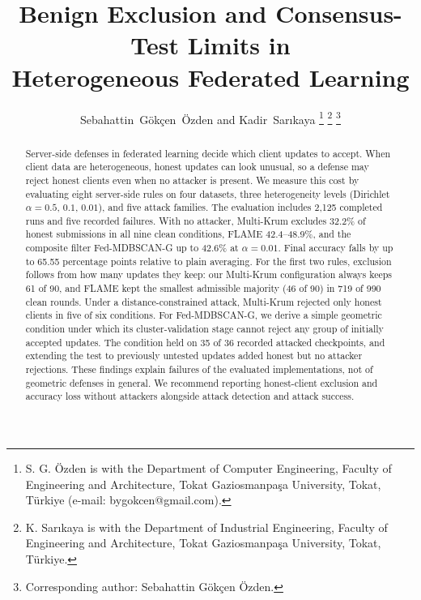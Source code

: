 \documentclass[journal]{IEEEtran}
\begin{document}
\title{Benign Exclusion and Consensus-Test Limits in\\Heterogeneous Federated Learning}

\author{Sebahattin~G\"ok\c{c}en~\"Ozden and Kadir~Sar{\i}kaya%
\thanks{S. G. \"Ozden is with the Department of Computer Engineering, Faculty of Engineering and Architecture, Tokat Gaziosmanpa\c{s}a University, Tokat, T\"urkiye (e-mail: bygokcen@gmail.com).}%
\thanks{K. Sar{\i}kaya is with the Department of Industrial Engineering, Faculty of Engineering and Architecture, Tokat Gaziosmanpa\c{s}a University, Tokat, T\"urkiye.}%
\thanks{Corresponding author: Sebahattin G\"ok\c{c}en \"Ozden.}}

\maketitle

\begin{abstract}
Server-side defenses in federated learning decide which client updates to accept. When client data are heterogeneous, honest updates can look unusual, so a defense may reject honest clients even when no attacker is present. We measure this cost by evaluating eight server-side rules on four datasets, three heterogeneity levels (Dirichlet $\alpha=0.5$, $0.1$, $0.01$), and five attack families. The evaluation includes 2,125 completed runs and five recorded failures. With no attacker, Multi-Krum excludes 32.2\% of honest submissions in all nine clean conditions, FLAME 42.4--48.9\%, and the composite filter Fed-MDBSCAN-G up to 42.6\% at $\alpha=0.01$. Final accuracy falls by up to 65.55 percentage points relative to plain averaging. For the first two rules, exclusion follows from how many updates they keep: our Multi-Krum configuration always keeps 61 of 90, and FLAME kept the smallest admissible majority (46 of 90) in 719 of 990 clean rounds. Under a distance-constrained attack, Multi-Krum rejected only honest clients in five of six conditions. For Fed-MDBSCAN-G, we derive a simple geometric condition under which its cluster-validation stage cannot reject any group of initially accepted updates. The condition held on 35 of 36 recorded attacked checkpoints, and extending the test to previously untested updates added honest but no attacker rejections. These findings explain failures of the evaluated implementations, not of geometric defenses in general. We recommend reporting honest-client exclusion and accuracy loss without attackers alongside attack detection and attack success.
\end{abstract}
\end{document}
